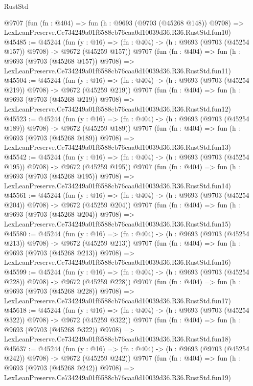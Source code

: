 \begin{lexlean}{RustStd}
\begin{coremodule}
    @9707
    (fun (fn : @404) =>
    fun (h : @9693 (@9703 (@45268 @148)) @9708) =>
    LexLeanPreserve.Ce734249a01f6588cb76caa0d10039d36.R36.RustStd.fun10)
@45485 := @45244
    (fun (y : @16) => (fn : @404) -> (h : @9693 (@9703 (@45254 @157)) @9708) -> @9672 (@45259 @157))
    @9707
    (fun (fn : @404) =>
    fun (h : @9693 (@9703 (@45268 @157)) @9708) =>
    LexLeanPreserve.Ce734249a01f6588cb76caa0d10039d36.R36.RustStd.fun11)
@45504 := @45244
    (fun (y : @16) => (fn : @404) -> (h : @9693 (@9703 (@45254 @219)) @9708) -> @9672 (@45259 @219))
    @9707
    (fun (fn : @404) =>
    fun (h : @9693 (@9703 (@45268 @219)) @9708) =>
    LexLeanPreserve.Ce734249a01f6588cb76caa0d10039d36.R36.RustStd.fun12)
@45523 := @45244
    (fun (y : @16) => (fn : @404) -> (h : @9693 (@9703 (@45254 @189)) @9708) -> @9672 (@45259 @189))
    @9707
    (fun (fn : @404) =>
    fun (h : @9693 (@9703 (@45268 @189)) @9708) =>
    LexLeanPreserve.Ce734249a01f6588cb76caa0d10039d36.R36.RustStd.fun13)
@45542 := @45244
    (fun (y : @16) => (fn : @404) -> (h : @9693 (@9703 (@45254 @195)) @9708) -> @9672 (@45259 @195))
    @9707
    (fun (fn : @404) =>
    fun (h : @9693 (@9703 (@45268 @195)) @9708) =>
    LexLeanPreserve.Ce734249a01f6588cb76caa0d10039d36.R36.RustStd.fun14)
@45561 := @45244
    (fun (y : @16) => (fn : @404) -> (h : @9693 (@9703 (@45254 @204)) @9708) -> @9672 (@45259 @204))
    @9707
    (fun (fn : @404) =>
    fun (h : @9693 (@9703 (@45268 @204)) @9708) =>
    LexLeanPreserve.Ce734249a01f6588cb76caa0d10039d36.R36.RustStd.fun15)
@45580 := @45244
    (fun (y : @16) => (fn : @404) -> (h : @9693 (@9703 (@45254 @213)) @9708) -> @9672 (@45259 @213))
    @9707
    (fun (fn : @404) =>
    fun (h : @9693 (@9703 (@45268 @213)) @9708) =>
    LexLeanPreserve.Ce734249a01f6588cb76caa0d10039d36.R36.RustStd.fun16)
@45599 := @45244
    (fun (y : @16) => (fn : @404) -> (h : @9693 (@9703 (@45254 @228)) @9708) -> @9672 (@45259 @228))
    @9707
    (fun (fn : @404) =>
    fun (h : @9693 (@9703 (@45268 @228)) @9708) =>
    LexLeanPreserve.Ce734249a01f6588cb76caa0d10039d36.R36.RustStd.fun17)
@45618 := @45244
    (fun (y : @16) => (fn : @404) -> (h : @9693 (@9703 (@45254 @322)) @9708) -> @9672 (@45259 @322))
    @9707
    (fun (fn : @404) =>
    fun (h : @9693 (@9703 (@45268 @322)) @9708) =>
    LexLeanPreserve.Ce734249a01f6588cb76caa0d10039d36.R36.RustStd.fun18)
@45637 := @45244
    (fun (y : @16) => (fn : @404) -> (h : @9693 (@9703 (@45254 @242)) @9708) -> @9672 (@45259 @242))
    @9707
    (fun (fn : @404) =>
    fun (h : @9693 (@9703 (@45268 @242)) @9708) =>
    LexLeanPreserve.Ce734249a01f6588cb76caa0d10039d36.R36.RustStd.fun19)

\end{coremodule}
\end{lexlean}

